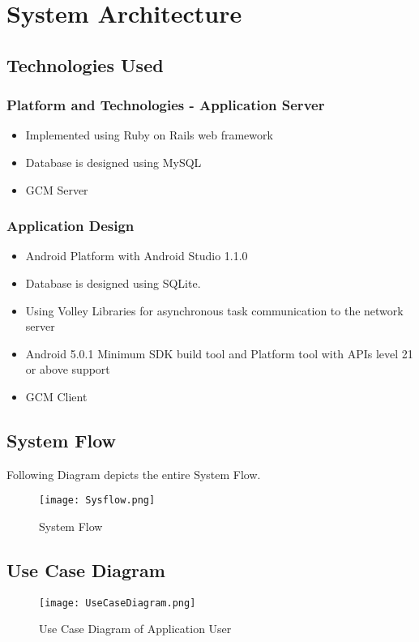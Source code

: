 \chapter{System Architecture}

\section{Technologies Used}
\subsection{Platform and Technologies - Application Server}
\begin{itemize}
  \item Implemented using Ruby on Rails web framework \cite{Ruby}
  \item Database is designed using MySQL
  \item GCM Server
\end{itemize}

\subsection{Application Design}

\begin{itemize}
\item Android Platform with Android Studio 1.1.0 \cite{Intro42:online}
\item Database is designed using SQLite.
\item Using Volley Libraries for asynchronous task communication to the network server \cite{Andro34:online}
\item Android 5.0.1 Minimum SDK build tool and Platform tool with APIs level 21 or above support
\item GCM Client
\end{itemize}

\section{System Flow}

Following Diagram depicts the entire System Flow.
\begin{figure}[H]
    \centering
	\texttt{[image: Sysflow.png]}
    \caption{System Flow}
    \label{fig:System Flow}
\end{figure}

\section{Use Case Diagram}
\begin{figure}[H]
    \centering
	\texttt{[image: UseCaseDiagram.png]}
    \caption{Use Case Diagram of Application User}
    \label{fig:Use Case Diagram of Application User}
\end{figure}


